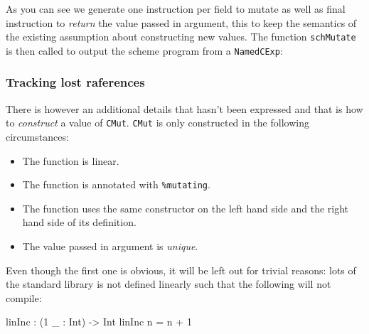 \documentclass[
]{article}
\newenvironment{Shaded}{}{}
\newcommand{\DataTypeTok}[1]{\textcolor[rgb]{0.56,0.13,0.00}{#1}}
\newcommand{\DecValTok}[1]{\textcolor[rgb]{0.25,0.63,0.44}{#1}}
\newcommand{\FunctionTok}[1]{\textcolor[rgb]{0.02,0.16,0.49}{#1}}
\newcommand{\NormalTok}[1]{#1}
\newcommand{\OperatorTok}[1]{\textcolor[rgb]{0.40,0.40,0.40}{#1}}
\newcommand{\OtherTok}[1]{\textcolor[rgb]{0.00,0.44,0.13}{#1}}
\providecommand{\tightlist}{%
  \setlength{\itemsep}{0pt}\setlength{\parskip}{0pt}}
\begin{document}
As you can see we generate one instruction per field to mutate as well
as final instruction to \emph{return} the value passed in argument, this
to keep the semantics of the existing assumption about constructing new
values. The function \texttt{schMutate} is then called to output the
scheme program from a \texttt{NamedCExp}:

\begin{Shaded}
\end{Shaded}

\hypertarget{tracking-lost-raferences}{%
\subsubsection{Tracking lost
raferences}\label{tracking-lost-raferences}}

There is however an additional details that hasn't been expressed and
that is how to \emph{construct} a value of \texttt{CMut}. \texttt{CMut}
is only constructed in the following circumstances:

\begin{itemize}
\tightlist
\item
  The function is linear.
\item
  The function is annotated with \texttt{\%mutating}.
\item
  The function uses the same constructor on the left hand side and the
  right hand side of its definition.
\item
  The value passed in argument is \emph{unique}.
\end{itemize}

Even though the first one is obvious, it will be left out for trivial
reasons: lots of the standard library is not defined linearly such that
the following will not compile:

\begin{Shaded}
\begin{Highlighting}[]
\NormalTok{linInc }\OperatorTok{:}\NormalTok{ (}\DecValTok{1}\NormalTok{ \_ }\OperatorTok{:} \DataTypeTok{Int}\NormalTok{) }\OtherTok{{-}\textgreater{}} \DataTypeTok{Int}
\NormalTok{linInc n }\OtherTok{=}\NormalTok{ n }\OperatorTok{+} \DecValTok{1}
\end{Highlighting}
\end{Shaded}
\end{document}
